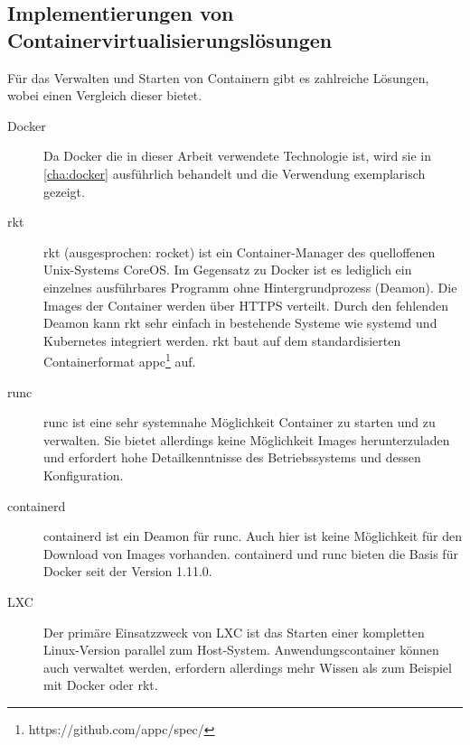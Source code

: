 
\subsection{Implementierungen von Containervirtualisierungslösungen}
Für das Verwalten und Starten von Containern gibt es zahlreiche Lösungen, wobei \autocite{rkt-comparison:online} einen Vergleich dieser bietet.
\label{sec:container-solutions}
\begin{description}
    \item [Docker] Da Docker die in dieser Arbeit verwendete Technologie ist, wird sie in \cref{cha:docker} ausführlich behandelt und die Verwendung exemplarisch gezeigt.
    \item [rkt] rkt (ausgesprochen: rocket) ist ein Container-Manager des quelloffenen Unix-Systems CoreOS. Im Gegensatz zu Docker ist es lediglich ein einzelnes ausführbares Programm ohne Hintergrundprozess (Deamon). Die Images der Container werden über HTTPS verteilt. Durch den fehlenden Deamon kann rkt sehr einfach in bestehende Systeme wie systemd und Kubernetes integriert werden. rkt baut auf dem standardisierten Containerformat appc\footnote{https://github.com/appc/spec/} auf.
    \item [runc] runc ist eine sehr systemnahe Möglichkeit Container zu starten und zu verwalten. Sie bietet allerdings keine Möglichkeit Images herunterzuladen und erfordert hohe Detailkenntnisse des Betriebssystems und dessen Konfiguration.
    \item [containerd] containerd ist ein Deamon für runc. Auch hier ist keine Möglichkeit für den Download von Images vorhanden. containerd und runc bieten die Basis für Docker seit der Version 1.11.0.
    \item [LXC] Der primäre Einsatzzweck von LXC ist das Starten einer kompletten Linux-Version parallel zum Host-System. Anwendungscontainer können auch verwaltet werden, erfordern allerdings mehr Wissen als zum Beispiel mit Docker oder rkt.
\end{description}

